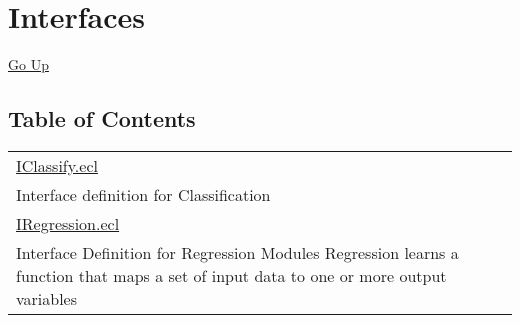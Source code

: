 \chapter*{\color{headtoc} Interfaces}
\hypertarget{ecldoc:toc:root/ML_Core/Interfaces}{}
\hyperlink{ecldoc:toc:}{Go Up}


\section*{Table of Contents}
{\renewcommand{\arraystretch}{1.5}
\begin{longtable}{|p{\textwidth}|}
\hline
\hyperlink{ecldoc:toc:ML_Core.Interfaces.IClassify}{IClassify.ecl} \\
Interface definition for Classification \\
\hline
\hyperlink{ecldoc:toc:ML_Core.Interfaces.IRegression}{IRegression.ecl} \\
Interface Definition for Regression Modules Regression learns a function that maps a set of input data to one or more output variables \\
\hline
\end{longtable}
}



